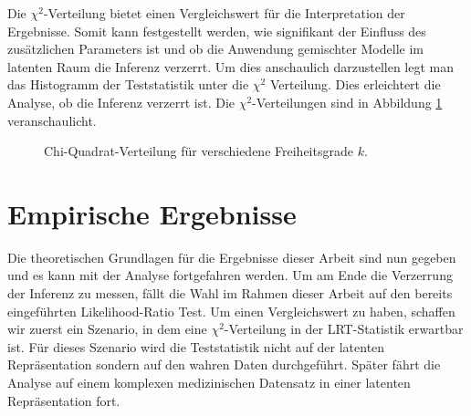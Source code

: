 \documentclass[%
thesis=student,%
coverpage=false,%
titlepage=false,%
headmarks=true, %
german,%
font=libertine, %
math=newpxtx, %
BCOR=5mm,%
coverBCOR=11mm%
]{tumbook}
\theoremstyle{break}
\begin{document}
Die $\chi^2$-Verteilung bietet einen Vergleichswert für die Interpretation der Ergebnisse. Somit kann festgestellt werden, wie signifikant der Einfluss des zusätzlichen Parameters ist und ob die Anwendung gemischter Modelle im latenten Raum die Inferenz verzerrt. Um dies anschaulich darzustellen legt man das Histogramm der Teststatistik unter die $\chi^2$ Verteilung. Dies erleichtert die Analyse, ob die Inferenz verzerrt ist. Die $\chi^2$-Verteilungen sind in Abbildung \ref{fig:chi2} veranschaulicht.\\
\begin{figure}[h!]
	\centering
	\caption{Chi-Quadrat-Verteilung für verschiedene Freiheitsgrade $k$.}
	\label{fig:chi2}
\end{figure}




\chapter{Empirische Ergebnisse}
Die theoretischen Grundlagen für die Ergebnisse dieser Arbeit sind nun gegeben und es kann mit der Analyse fortgefahren werden. Um am Ende die Verzerrung der Inferenz zu messen, fällt die Wahl im Rahmen dieser Arbeit auf den bereits eingeführten Likelihood-Ratio Test. Um einen Vergleichswert zu haben, schaffen wir zuerst ein Szenario, in dem eine $\chi^2$-Verteilung in der LRT-Statistik erwartbar ist. Für dieses Szenario wird die Teststatistik nicht auf der latenten Repräsentation sondern auf den wahren Daten durchgeführt. Später fährt die Analyse auf einem komplexen medizinischen Datensatz in einer latenten Repräsentation fort.
\end{document}
